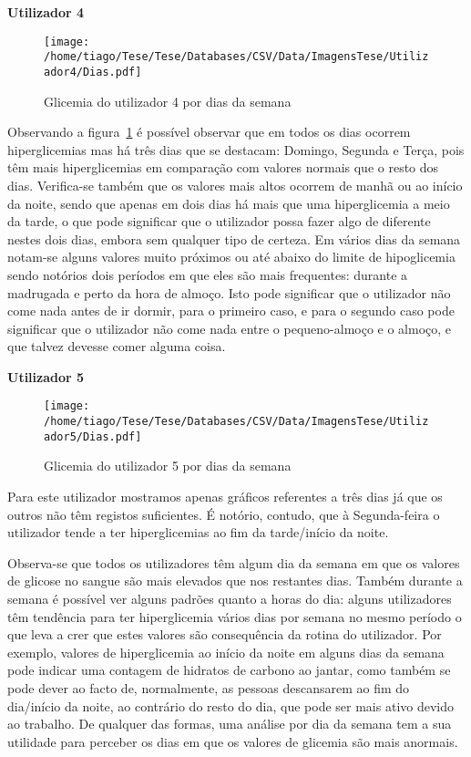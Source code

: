 \textbf{Utilizador 4}

\begin{figure}[H]
\centering
\texttt{[image: /home/tiago/Tese/Tese/Databases/CSV/Data/ImagensTese/Utilizador4/Dias.pdf]}
\caption{Glicemia do utilizador 4 por dias da semana}
\label{fig:dias4}
\end{figure}
Observando a figura~\ref{fig:dias4} é possível observar que em todos os dias ocorrem hiperglicemias mas há três dias que se destacam: Domingo, Segunda e Terça, pois têm mais hiperglicemias em comparação com valores normais que o resto dos dias. Verifica-se também que os valores mais altos ocorrem de manhã ou ao início da noite, sendo que apenas em dois dias há mais que uma hiperglicemia a meio da tarde, o que pode significar que o utilizador possa fazer algo de diferente nestes dois dias, embora sem qualquer tipo de certeza. 
Em vários dias da semana notam-se alguns valores muito próximos ou até abaixo do limite de hipoglicemia sendo notórios dois períodos em que eles são mais frequentes: durante a madrugada e perto da hora de almoço. Isto pode significar que o utilizador não come nada antes de ir dormir, para o primeiro caso, e para o segundo caso pode significar que o utilizador não come nada entre o pequeno-almoço e o almoço, e que talvez devesse comer alguma coisa.\newpage


\textbf{Utilizador 5}

\begin{figure}[H]
\centering
\texttt{[image: /home/tiago/Tese/Tese/Databases/CSV/Data/ImagensTese/Utilizador5/Dias.pdf]}
\caption{Glicemia do utilizador 5 por dias da semana}
\label{fig:dias5}
\end{figure}
Para este utilizador mostramos apenas gráficos referentes a três dias já que os outros não têm registos suficientes. É notório, contudo, que à Segunda-feira o utilizador tende a ter hiperglicemias ao fim da tarde/início da noite.\newline

Observa-se que todos os utilizadores têm algum dia da semana em que os valores de glicose no sangue são mais elevados que nos restantes dias. Também durante a semana é possível ver alguns padrões quanto a horas do dia: alguns utilizadores têm tendência para ter hiperglicemia vários dias por semana no mesmo período o que leva a crer que estes valores são consequência da rotina do utilizador. Por exemplo, valores de hiperglicemia ao início da noite em alguns dias da semana pode indicar uma contagem de hidratos de carbono ao jantar, como também se pode dever ao facto de, normalmente, as pessoas descansarem ao fim do dia/início da noite, ao contrário do resto do dia, que pode ser mais ativo devido ao trabalho. De qualquer das formas, uma análise por dia da semana tem a sua utilidade para perceber os dias em que os valores de glicemia são mais anormais.



